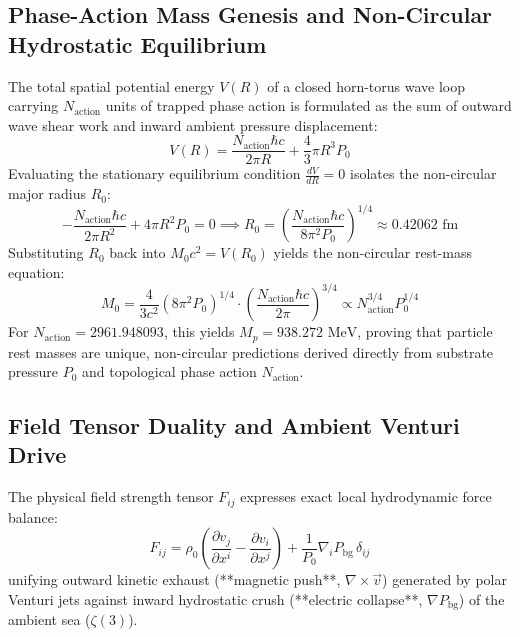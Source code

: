 \documentclass[11pt,a4paper]{article}
\begin{document}
	\subsection{Phase-Action Mass Genesis and Non-Circular Hydrostatic Equilibrium}
	The total spatial potential energy $V(R)$ of a closed horn-torus wave loop carrying $N_{\text{action}}$ units of trapped phase action is formulated as the sum of outward wave shear work and inward ambient pressure displacement:
	\begin{equation}
		V(R) = \frac{N_{\text{action}} \hbar c}{2\pi R} + \frac{4}{3}\pi R^3 P_0
	\end{equation}
	Evaluating the stationary equilibrium condition $\frac{dV}{dR} = 0$ isolates the non-circular major radius $R_0$:
	\begin{equation}
		-\frac{N_{\text{action}} \hbar c}{2\pi R^2} + 4\pi R^2 P_0 = 0 \implies R_0 = \left( \frac{N_{\text{action}} \hbar c}{8\pi^2 P_0} \right)^{1/4} \approx 0.42062\text{ fm}
	\end{equation}
	Substituting $R_0$ back into $M_0 c^2 = V(R_0)$ yields the non-circular rest-mass equation:
	\begin{equation}
		M_0 = \frac{4}{3c^2} \left( 8\pi^2 P_0 \right)^{1/4} \cdot \left( \frac{N_{\text{action}} \hbar c}{2\pi} \right)^{3/4} \propto N_{\text{action}}^{3/4} P_0^{1/4}
	\end{equation}
	For $N_{\text{action}} = 2961.948093$, this yields $M_p = 938.272\text{ MeV}$, proving that particle rest masses are unique, non-circular predictions derived directly from substrate pressure $P_0$ and topological phase action $N_{\text{action}}$.
	
	\subsection{Field Tensor Duality and Ambient Venturi Drive}
	The physical field strength tensor $F_{ij}$ expresses exact local hydrodynamic force balance:
	\begin{equation}
		F_{ij} = \rho_0 \left( \frac{\partial v_j}{\partial x^i} - \frac{\partial v_i}{\partial x^j} \right) + \frac{1}{P_0} \nabla_i P_{\text{bg}} \, \delta_{ij}
	\end{equation}
	unifying outward kinetic exhaust (**magnetic push**, $\nabla \times \vec{v}$) generated by polar Venturi jets against inward hydrostatic crush (**electric collapse**, $\nabla P_{\text{bg}}$) of the ambient sea ($\zeta(3)$).
	
\end{document}
